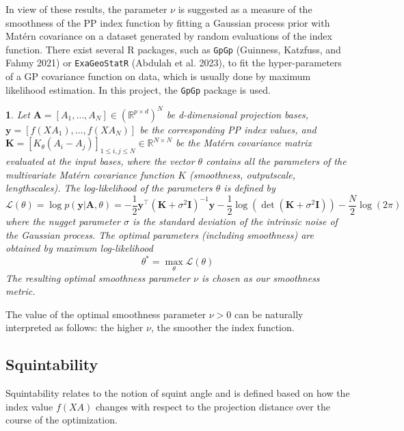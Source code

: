 \documentclass[
  12pt,
]{interact}
\theoremstyle{plain}
\newtheorem{defn}{\protect\definitionname}
\providecommand{\definitionname}{Definition}
\begin{document}
In view of these results, the parameter \(\nu\) is suggested as a
measure of the smoothness of the PP index function by fitting a Gaussian
process prior with Matérn covariance on a dataset generated by random
evaluations of the index function. There exist several R packages, such
as \texttt{GpGp} (Guinness, Katzfuss, and Fahmy 2021) or
\texttt{ExaGeoStatR} (Abdulah et al. 2023), to fit the hyper-parameters
of a GP covariance function on data, which is usually done by maximum
likelihood estimation. In this project, the \texttt{GpGp} package is
used.

\begin{defn}
Let $\mathbf{A}=[A_1, \ldots, A_N] \in (\mathbb{R}^{p \times d})^N$ be d-dimensional projection bases, $\mathbf{y}=[f(XA_1),\ldots,f(XA_N)]$ be the corresponding PP index values, and $\mathbf{K}=[K_\theta(A_{i}-A_{j})]_{1\leq i,j\leq N}\in\mathbb{R}^{N\times N}$ be the Matérn covariance matrix evaluated at the input bases, where the vector $\theta$ contains all the parameters of the multivariate Matérn covariance function $K$ (smoothness, outputscale, lengthscales). The log-likelihood of the parameters $\theta$ is defined by 
\begin{equation}
\mathcal{L}(\theta)=\log p(\mathbf{y}\left|\mathbf{A},\theta\right.)=-\frac{1}{2}\mathbf{y}^{\top}(\mathbf{K}+\sigma^{2}\mathbf{I})^{-1}\mathbf{y}-\frac{1}{2}\mathrm{\log}(\det(\mathbf{K}+\sigma^{2}\mathbf{I}))-\frac{N}{2}\log(2\pi)\, \label{eq:gp_log_likelihood}
\end{equation}
where the nugget parameter $\sigma$ is the standard deviation of the intrinsic noise of the Gaussian process.
The optimal parameters (including smoothness) are obtained by maximum log-likelihood
\begin{equation}
\theta^* = \underset{\theta}{\max}\mathcal{L}(\theta)
\end{equation}
The resulting optimal smoothness parameter $\nu$ is chosen as our smoothness metric.
\end{defn}

The value of the optimal smoothness parameter \(\nu>0\) can be naturally
interpreted as follows: the higher \(\nu\), the smoother the index
function.

\subsection{Squintability}\label{sec-squintability}

Squintability relates to the notion of squint angle and is defined based
on how the index value \(f(XA)\) changes with respect to the projection
distance over the course of the optimization.
\end{document}
